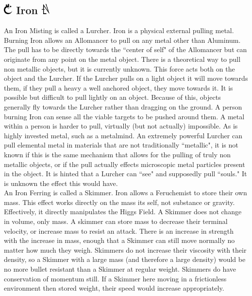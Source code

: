 \documentclass[conference]{IEEEtran}
\begin{document}
\subsection*{\includegraphics[height=1em]{images/Iron.png}  Iron \includegraphics[height=1em]{images/Iron_(Feruchemy).png}}
An Iron Misting is called a Lurcher.\cite{ARS}  Iron is a physical external pulling metal.\cite{AL-TB}  Burning Iron allows an Allomancer to pull on any metal\cite{ARS} other than Aluminum.\cite{BoM-CH2}  The pull has to be directly towards the ``center of self"\cite{CoS} of the Allomancer but can originate from any point on the metal object.\cite{TFE-CH34}  There is a theoretical way to pull non metallic objects, but it is currently unknown.\cite{non-metal}\cite{BoM-CH28}
This force acts both on the object and the Lurcher. If the Lurcher pulls on a light object it will move towards them, if they pull a heavy a well anchored object, they move towards it.\cite{TFE-CH7}
It is possible but difficult to pull lightly on an object.\cite{TFE-CH7} \cite{WoA-CH17}  Because of this, objects generally fly towards the Lurcher rather than dragging on the ground.
A person burning Iron can sense all the viable targets to be pushed around them.\cite{TFE-CH7}
A metal within a person is harder to pull,\cite{TFE-CH7} virtually (but not actually) impossible.\cite{TFE-CH38}\cite{HoA-CH73}  As is highly invested metal, such as a metalmind.\cite{SoS-CH7}
An extremely powerful Lurcher can pull elemental metal in materials that are not traditionally ``metallic",\cite{BoM-CH28} it is not known if this is the same mechanism that allows for the pulling of truly non metallic objects, or if the pull actually effects microscopic metal particles present in the object.\cite{non-metal}
It is hinted that a Lurcher can ``see" and supposedly pull ``souls."\cite{BoM-CH28}  It is unknown the effect this would have.\\


An Iron Ferring is called a Skimmer.\cite{ARS}  Iron allows a Feruchemist to store their own mass.\cite{ARS}  This effect works directly on the mass its self, not substance or gravity.  Effectively, it directly manipulates the Higgs Field.\cite{higgs}  A Skimmer does not change in volume, only mass.  A skimmer can store mass to decrease their terminal velocity,\cite{BoM-CH12} or increase mass to resist an attack.\cite{HoA-CH78}  There is an increase in strength with the increase in mass, enough that a Skimmer can still move normally no matter how much they weigh.\cite{WoA-CH52}
Skimmers do not increase their viscosity with their density, so a Skimmer with a large mass (and therefore a large density) would be no more bullet resistant than a Skimmer at regular weight.\cite{gunshot-weak}
Skimmers do have conservation of momentum still.\cite{BoM-CH12}  If a Skimmer here moving in a frictionless environment then stored weight, their speed would increase appropriately.
\end{document}
